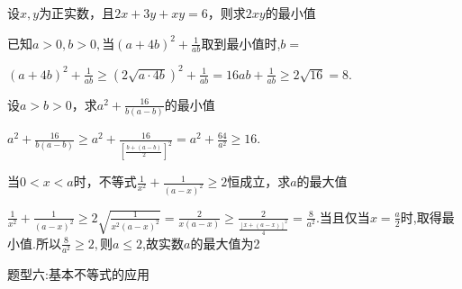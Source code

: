 \documentclass[11pt,a4paper]{ctexbook}
\begin{document}
\par
\begin{problem}
    设$x,y$为正实数，且$2x+3y+xy=6$，则求$2xy$的最小值
\end{problem}

\par
\begin{problem}
    已知$a>0,b>0,$当$\displaystyle (a+4b)^2+\frac{1}{ab}$取到最小值时,$b=$
    \begin{jiexi}
        $\displaystyle (a+4b)^2+\frac{1}{ab}\ge(2\sqrt{a\cdot4b})^2+\frac{1}{ab}=16ab+\frac{1}{ab}\ge 2\sqrt{16}=8$.
    \end{jiexi}
\end{problem}

\par
\begin{problem}
    设$a>b>0$，求$\displaystyle a^2+\frac{16}{b(a-b)}$的最小值
    \begin{jiexi}
        $\displaystyle a^2+\frac{16}{b(a-b)}\ge a^2+\frac{16}{[\frac{b+(a-b)}{2}]^2}=a^2+\frac{64}{a^2}\ge16$.
    \end{jiexi}
\end{problem}

\par
\begin{problem}
    当$0<x<a$时，不等式$\displaystyle \frac{1}{x^2}+\frac{1}{(a-x)^2}\ge2$恒成立，求$a$的最大值
    \begin{jiexi}
        $\displaystyle \frac{1}{x^2}+\frac{1}{(a-x)^2}\ge 2\sqrt{\frac{1}{x^2(a-x)^2}}=\frac{2}{x(a-x)}\ge \frac{2}{\frac{[x+(a-x)]^2}{4}}=\frac{8}{a^2}$.当且仅当$x=\frac{a}{2}$时,取得最小值.所以$\displaystyle \frac{8}{a^2}\ge2,\text{则}a\le2$,故实数$a$的最大值为2
    \end{jiexi}
\end{problem}




\begin{tcolorbox} 
    \centering
    题型六:基本不等式的应用
\end{tcolorbox}
\end{document}
